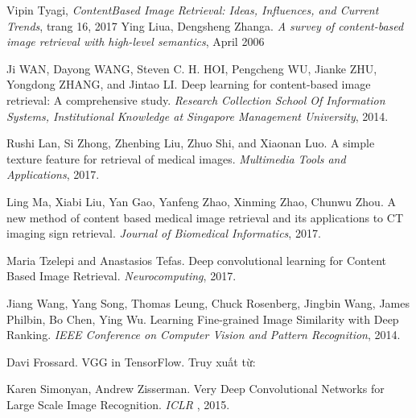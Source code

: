 \documentclass[a4paper,14pt]{extreport}
\begin{document}
\begin{thebibliography}{9}
Vipin Tyagi, \textit{ContentBased Image Retrieval: Ideas, Influences, and Current Trends}, trang 16, 2017
Ying Liua, Dengsheng Zhanga. \textit{A survey of content-based image retrieval with high-level semantics},  April 2006

Ji WAN, Dayong WANG, Steven C. H. HOI, Pengcheng WU, Jianke ZHU, Yongdong ZHANG, and Jintao LI.
Deep learning for content-based image retrieval: A comprehensive study.
\textit{Research Collection School Of Information Systems, Institutional Knowledge at Singapore Management University}, 2014.
 
Rushi Lan, Si Zhong, Zhenbing Liu, Zhuo Shi, and Xiaonan Luo.
A simple texture feature for retrieval of medical images.
\textit{Multimedia Tools and Applications}, 2017.
 
Ling Ma, Xiabi Liu, Yan Gao, Yanfeng Zhao, Xinming Zhao, Chunwu Zhou. A new method of content based medical image retrieval and its applications to CT imaging sign retrieval.
\textit{Journal of Biomedical Informatics}, 2017.

Maria Tzelepi and Anastasios Tefas. Deep convolutional learning for Content Based Image Retrieval.
\textit{Neurocomputing}, 2017.

Jiang Wang, Yang Song, Thomas Leung, Chuck Rosenberg, Jingbin Wang, James Philbin, Bo Chen, Ying Wu. Learning Fine-grained Image Similarity with Deep Ranking.
\textit{IEEE Conference on Computer Vision and Pattern Recognition}, 2014.

Davi Frossard. VGG in TensorFlow. Truy xuất từ: \texttt{}

Karen Simonyan, Andrew Zisserman. Very Deep Convolutional Networks for Large Scale Image Recognition.
\textit{ ICLR }, 2015.
\end{thebibliography}
\end{document}
